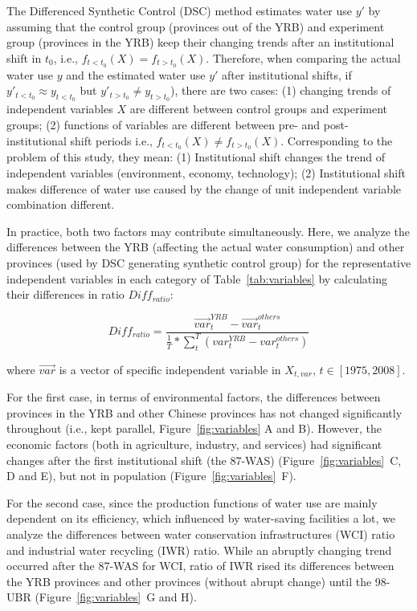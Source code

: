 \graphicspath{{../../../figs/}}

The Differenced Synthetic Control (DSC) method estimates water use $y'$ by assuming that the control group (provinces out of the YRB) and experiment group (provinces in the YRB) keep their changing trends after an institutional shift in $t_0$, i.e., $f_{t<t_0}(X) = f_{t>t_0}(X)$.
Therefore, when comparing the actual water use $y$ and the estimated water use $y'$ after institutional shifts, if $y'_{t<t_0} \approx y_{t<t_0}$ but $y'_{t>t_0} \neq y_{t>t_0}$), there are two cases: (1) changing trends of independent variables $X$ are different between control groups and experiment groups; (2) functions of variables are different between pre- and post- institutional shift periods i.e., $f_{t<t_0}(X) \neq f_{t>t_0}(X)$.
Corresponding to the problem of this study, they mean: (1) Institutional shift changes the trend of independent variables (environment, economy, technology); (2) Institutional shift makes difference of water use caused by the change of unit independent variable combination different.

In practice, both two factors may contribute simultaneously.
Here, we analyze the differences between the YRB (affecting the actual water consumption) and other provinces (used by DSC generating synthetic control group) for the representative independent variables in each category of Table~\ref{tab:variables} by calculating their differences in ratio $Diff_{ratio}$:

\begin{equation}
    Diff_{ratio} = \frac{\vec{var}^{YRB}_{t} - \vec{var}^{others}_{t}}{\frac{1}{T} * \sum_{t}^T (var^{YRB}_{t} - var^{others}_{t})}
\end{equation}

where $\vec{var}$ is a vector of specific independent variable in $X_{t, var}$, $t\in [1975, 2008]$.

For the first case, in terms of environmental factors, the differences between provinces in the YRB and other Chinese provinces has not changed significantly throughout (i.e., kept parallel, Figure~\ref{fig:variables} A and B). However, the economic factors (both in agriculture, industry, and services) had significant changes after the first institutional shift (the 87-WAS) (Figure~\ref{fig:variables}~C, D and E), but not in population (Figure~\ref{fig:variables}~F).

For the second case, since the production functions of water use are mainly dependent on its efficiency, which influenced by water-saving facilities a lot, we analyze the differences between water conservation infrastructures (WCI) ratio and industrial water recycling (IWR) ratio. While an abruptly changing trend occurred after the 87-WAS for WCI, ratio of IWR rised its differences between the YRB provinces and other provinces (without abrupt change) until the 98-UBR (Figure~\ref{fig:variables}~G and H).

